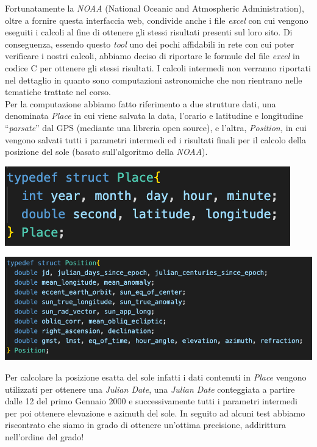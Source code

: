 \noindent Fortunatamente la \emph{NOAA} (National Oceanic and Atmospheric
Administration), oltre a fornire questa interfaccia web, condivide anche
i file \emph{excel} con cui vengono eseguiti i calcoli al fine di
ottenere gli stessi risultati presenti sul loro sito. Di conseguenza,
essendo questo \emph{tool} uno dei pochi affidabili in rete con cui
poter verificare i nostri calcoli, abbiamo deciso di riportare le
formule del file \emph{excel} in codice C per ottenere gli stessi
risultati. I calcoli intermedi non verranno riportati nel dettaglio in
quanto sono computazioni astronomiche che non rientrano nelle tematiche
trattate nel corso.\\
Per la computazione abbiamo fatto riferimento a due strutture dati, una
denominata \emph{Place} in cui viene salvata la data, l'orario e
latitudine e longitudine ``\emph{parsate}'' dal GPS (mediante una
libreria open source), e l'altra, \emph{Position,} in cui vengono
salvati tutti i parametri intermedi ed i risultati finali per il calcolo
della posizione del sole (basato sull'algoritmo della \emph{NOAA}).

\begin{center}
\includegraphics[scale=1]{figures/image25.png}
\captionsetup{type=figure}
\end{center}

\begin{center}
\includegraphics[scale=0.8]{figures/image33.png}
\captionsetup{type=figure}
\end{center}

\noindent Per calcolare la posizione esatta del sole infatti i dati contenuti in
\emph{Place} vengono utilizzati per ottenere una \emph{Julian Date},
una \emph{Julian Date} conteggiata a partire dalle 12 del primo Gennaio
2000 e successivamente tutti i parametri intermedi per poi ottenere
elevazione e azimuth del sole. In seguito ad alcuni test abbiamo
riscontrato che siamo in grado di ottenere un'ottima precisione,
addirittura nell'ordine del grado!

